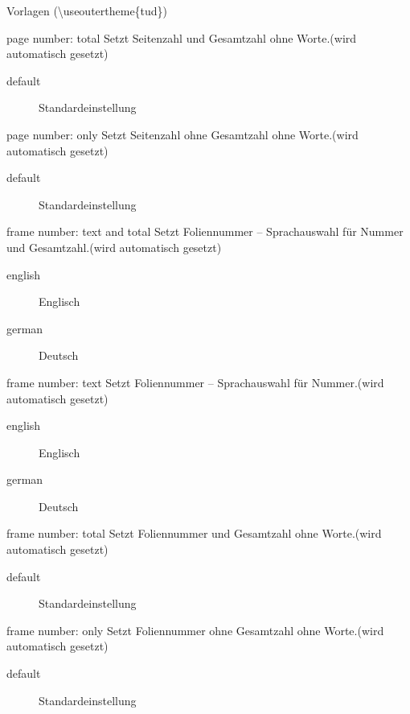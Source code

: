 \documentclass[presentation,t]{beamer}
\begin{document}
\begin{frame}[allowframebreaks,label=sec-2-2-4]{Vorlagen (\textbackslash useoutertheme\{tud\})}
\begin{block}{page number: total}
Setzt Seitenzahl und Gesamtzahl ohne Worte.(wird automatisch gesetzt)
\begin{description}
\item[{default}] Standardeinstellung
\end{description}
\end{block}

\begin{block}{page number: only}
Setzt Seitenzahl ohne Gesamtzahl ohne Worte.(wird automatisch gesetzt)
\begin{description}
\item[{default}] Standardeinstellung
\end{description}
\end{block}

\begin{block}{frame number: text and total}
Setzt Foliennummer – Sprachauswahl für Nummer und Gesamtzahl.(wird automatisch gesetzt)
\begin{description}
\item[{english}] Englisch
\item[{german}] Deutsch
\end{description}
\end{block}

\begin{block}{frame number: text}
Setzt Foliennummer – Sprachauswahl für Nummer.(wird automatisch gesetzt)
\begin{description}
\item[{english}] Englisch
\item[{german}] Deutsch
\end{description}
\end{block}

\begin{block}{frame number: total}
Setzt Foliennummer und Gesamtzahl ohne Worte.(wird automatisch gesetzt)
\begin{description}
\item[{default}] Standardeinstellung
\end{description}
\end{block}

\begin{block}{frame number: only}
Setzt Foliennummer ohne  Gesamtzahl ohne Worte.(wird automatisch gesetzt)
\begin{description}
\item[{default}] Standardeinstellung
\end{description}
\end{block}



\end{frame}
\end{document}
